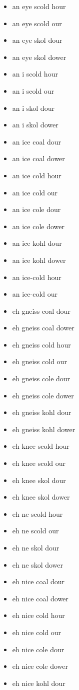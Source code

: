 \begin{itemize}
\item an eye scold hour
\item an eye scold our
\item an eye skol dour
\item an eye skol dower
\item an i scold hour
\item an i scold our
\item an i skol dour
\item an i skol dower
\item an ice coal dour
\item an ice coal dower
\item an ice cold hour
\item an ice cold our
\item an ice cole dour
\item an ice cole dower
\item an ice kohl dour
\item an ice kohl dower
\item an ice-cold hour
\item an ice-cold our
\item eh gneiss coal dour
\item eh gneiss coal dower
\item eh gneiss cold hour
\item eh gneiss cold our
\item eh gneiss cole dour
\item eh gneiss cole dower
\item eh gneiss kohl dour
\item eh gneiss kohl dower
\item eh knee scold hour
\item eh knee scold our
\item eh knee skol dour
\item eh knee skol dower
\item eh ne scold hour
\item eh ne scold our
\item eh ne skol dour
\item eh ne skol dower
\item eh nice coal dour
\item eh nice coal dower
\item eh nice cold hour
\item eh nice cold our
\item eh nice cole dour
\item eh nice cole dower
\item eh nice kohl dour

\end{itemize}
